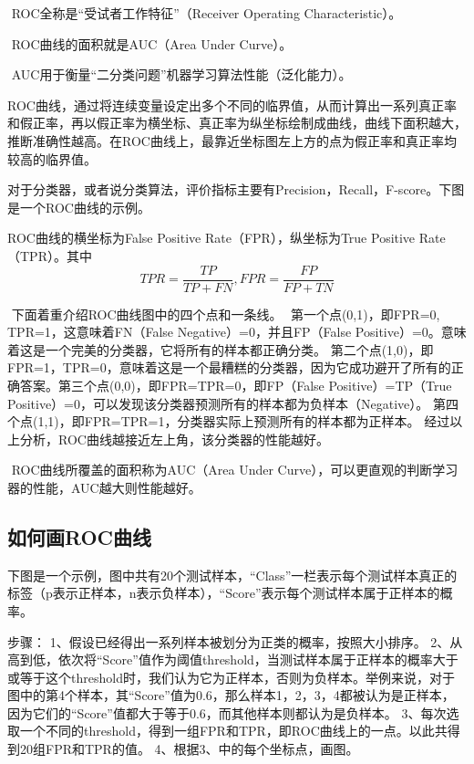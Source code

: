 ​ ROC全称是``受试者工作特征''（Receiver Operating Characteristic）。

​ ROC曲线的面积就是AUC（Area Under Curve）。

​ AUC用于衡量``二分类问题''机器学习算法性能（泛化能力）。

​
ROC曲线，通过将连续变量设定出多个不同的临界值，从而计算出一系列真正率和假正率，再以假正率为横坐标、真正率为纵坐标绘制成曲线，曲线下面积越大，推断准确性越高。在ROC曲线上，最靠近坐标图左上方的点为假正率和真正率均较高的临界值。

​
对于分类器，或者说分类算法，评价指标主要有Precision，Recall，F-score。下图是一个ROC曲线的示例。


ROC曲线的横坐标为False Positive Rate（FPR），纵坐标为True Positive
Rate（TPR）。其中 \[
TPR = \frac{TP}{TP+FN} ,FPR = \frac{FP}{FP+TN}
\]

​ 下面着重介绍ROC曲线图中的四个点和一条线。 ​ 第一个点(0,1)，即FPR=0,
TPR=1，这意味着FN（False Negative）=0，并且FP（False
Positive）=0。意味着这是一个完美的分类器，它将所有的样本都正确分类。 ​
第二个点(1,0)，即FPR=1，TPR=0，意味着这是一个最糟糕的分类器，因为它成功避开了所有的正确答案。
​ 第三个点(0,0)，即FPR=TPR=0，即FP（False Positive）=TP（True
Positive）=0，可以发现该分类器预测所有的样本都为负样本（Negative）。 ​
第四个点(1,1)，即FPR=TPR=1，分类器实际上预测所有的样本都为正样本。 ​
经过以上分析，ROC曲线越接近左上角，该分类器的性能越好。

​ ROC曲线所覆盖的面积称为AUC（Area Under
Curve），可以更直观的判断学习器的性能，AUC越大则性能越好。

\subsection{如何画ROC曲线}\label{ux5982ux4f55ux753brocux66f2ux7ebf}

​
下图是一个示例，图中共有20个测试样本，``Class''一栏表示每个测试样本真正的标签（p表示正样本，n表示负样本），``Score''表示每个测试样本属于正样本的概率。

步骤： 1、假设已经得出一系列样本被划分为正类的概率，按照大小排序。
2、从高到低，依次将``Score''值作为阈值threshold，当测试样本属于正样本的概率大于或等于这个threshold时，我们认为它为正样本，否则为负样本。举例来说，对于图中的第4个样本，其``Score''值为0.6，那么样本1，2，3，4都被认为是正样本，因为它们的``Score''值都大于等于0.6，而其他样本则都认为是负样本。
3、每次选取一个不同的threshold，得到一组FPR和TPR，即ROC曲线上的一点。以此共得到20组FPR和TPR的值。
4、根据3、中的每个坐标点，画图。

